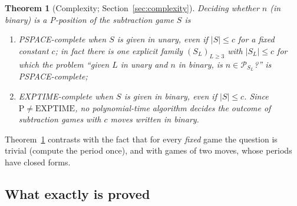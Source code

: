 \documentclass[11pt]{article}
\newtheorem{theorem}{Theorem}
\theoremstyle{definition}
\newcommand{\cP}{\mathcal{P}}
\begin{document}
\begin{theorem}[Complexity; Section~\ref{sec:complexity}]\label{thm:complexintro}
Deciding whether $n$ (in binary) is a P-position of the subtraction game $S$ is
\begin{enumerate}[label=(\alph*)]
\item PSPACE-complete when $S$ is given in unary, even if $|S|\le c$ for a fixed constant $c$; in
fact there is one explicit family $(S_L)_{L\ge3}$ with $|S_L|\le c$ for which the problem
``given $L$ in unary and $n$ in binary, is $n\in\cP_{S_L}$?'' is PSPACE-complete;
\item EXPTIME-complete when $S$ is given in binary, even if $|S|\le c$.  Since
$\mathrm{P}\ne\mathrm{EXPTIME}$, no polynomial-time algorithm decides the outcome of subtraction
games with $c$ moves written in binary.
\end{enumerate}
\end{theorem}

Theorem~\ref{thm:complexintro} contrasts with the fact that for every \emph{fixed} game the question
is trivial (compute the period once), and with games of two moves, whose periods have closed forms.

\subsection{What exactly is proved}\label{sec:scope}
\end{document}
